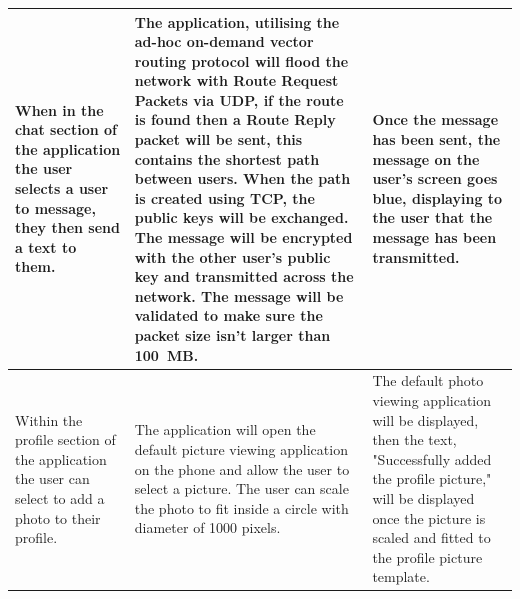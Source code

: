 \documentclass[a4paper, titlepage]{article}
\begin{document}
\begin{tabularx}{\linewidth}{ |*{3}{X|}}
	\hline\hline
	When in the chat section of the application the user selects a user to message, they then send a text to them. & The application, utilising the ad-hoc on-demand vector routing protocol will flood the network with Route Request Packets via UDP, if the route is found then a Route Reply packet will be sent, this contains the shortest path between users. When the path is created using TCP, the public keys will be exchanged. The message will be encrypted with the other user's public key and transmitted across the network. The message will be validated to make sure the packet size isn't larger than 100 MB. & Once the message has been sent, the message on the user's screen goes blue, displaying to the user that the message has been transmitted. \\
	\hline\hline
	Within the profile section of the application the user can select to add a photo to their profile. & The application will open the default picture viewing application on the phone and allow the user to select a picture. The user can scale the photo to fit inside a circle with diameter of 1000 pixels. & The default photo viewing application will be displayed, then the text, "Successfully added the profile picture," will be displayed once the picture is scaled and fitted to the profile picture template.\\
\hline
\end{tabularx}
\end{document}
